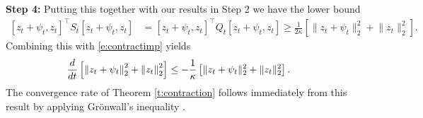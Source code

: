\begin{Proof}
\textbf{Step 4:}
Putting this together with our results in Step 2 we have the lower bound
\begin{align*}
\left[z_t+\psi_t,z_t \right]^{\top}S_t \left[z_t+\psi_t,z_t \right] & = \left[z_t+\psi_t,z_t \right]^{\top} Q_t \left[z_t+\psi_t,z_t \right] \ge \frac{1}{2\kappa}\left[ \lVert z_t+\psi_t  \rVert_2^2 + \lVert z_t \rVert_2^2\right].
\end{align*}
Combining this with \eqref{e:contractimp} yields
\begin{align*}
\frac{d}{d t} \left[\left\| z_t+ \psi_t\right\|_2^2 + \left\| z_t\right\|_2^2\right] & \le - \frac{1}{\kappa}\left[ \lVert z_t+\psi_t  \rVert_2^2 + \lVert z_t \rVert_2^2\right].
\end{align*}
%
The convergence rate of Theorem \ref{t:contraction} follows immediately from this result by applying Gr{\"o}nwall's inequality \citep[Corollary 3 in][]{dragomir2000some}.
\end{Proof}